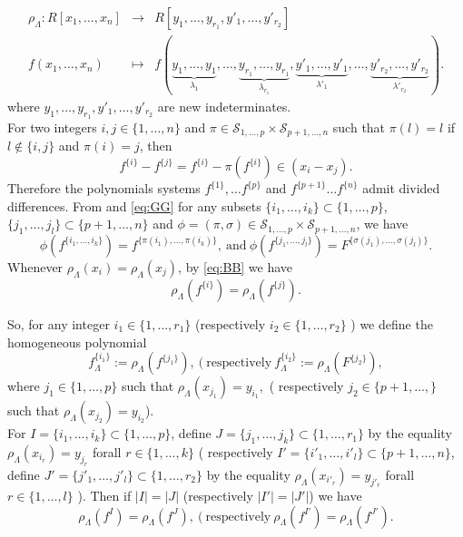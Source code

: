 \documentclass[12pt,a4paper,reqno]{amsart}
\theoremstyle{definition}
\theoremstyle{remark}
\numberwithin{equation}{section}
\begin{document}
\begin{eqnarray}\label{eq:rhol}
 \rho_{\Lambda} : R[x_{1},\ldots,x_{n}] & \rightarrow & R[y_{1},\ldots,y_{r_1},y'_{1},\ldots,y'_{r_2}] \\ \nonumber
 f(x_{1},\ldots,x_{n}) & \mapsto & f( \underbrace{y_{1},\ldots,y_{1}}_{\lambda_{1}} ,\ldots, \underbrace{y_{r_1},\ldots,y_{r_1}}_{\lambda_{r_1}}, \underbrace{y'_{1},\ldots,y'_{1}}_{\lambda'_{1}} ,\ldots, \underbrace{y'_{r_2},\ldots,y'_{r_2}}_{\lambda'_{r_2}}).
 \end{eqnarray} where $y_{1},\ldots,y_{r_1},y'_{1},\ldots,y'_{r_2}$ are new indeterminates.\\
For two integers ${i,j} \in \{ 1,\ldots,n \}$ and $\pi \in \mathcal{S}_{1,\ldots,p} \times \mathcal{S}_{p+1, \ldots,n}$ such that $\pi(l)=l$ if $l\notin \{i,j \}$ and $\pi(i)=j$, then 
\begin{equation} \label{eq:BB}
 f^{\{i\}} -f^{\{j\}} = f^{\{i\}}-\pi(f^{\{i\}}) \in (x_i-x_j).
 \end{equation}
Therefore the polynomials systems $f^{\{1\}}, \ldots f^{\{p\}}$ and  $f^{\{p+1\}} \ldots f^{\{n\}}$ admit divided differences. From \cite[Lemma 2.1]{BuKa16} and \eqref{eq:GG}
for any subsets $\{i_1, \ldots, i_k \} \subset \{1,\ldots,p\}$, $\{j_1, \ldots, j_l\} \subset \{p+1,\ldots,n \}$ and $\phi=(\pi, \sigma) \in  \mathcal{S}_{1,\ldots,p} \times \mathcal{S}_{p+1, \ldots,n}$, we have 
\begin{equation}
\phi (f^{\{i_1, \ldots, i_k \}})= f^{ \{ \pi(i_1), \ldots, \pi(i_k) \}},\  \mbox{and}\  \phi (f^{\{j_1, \ldots, j_l \}})= F^{ \{ \sigma (j_1), \ldots, \sigma(j_l) \}}.
\end{equation}
Whenever $\rho_{\Lambda} (x_i)=\rho_{\Lambda}(x_j)$, by \eqref{eq:BB} we have 
$$ \rho_{\Lambda} (f^{\{i\}})= \rho_{\Lambda}(f^{\{j\}}).$$ 

So, for any integer $ i_1 \in \{ 1, \ldots, r_1 \}$ (respectively $ i_2 \in \{ 1, \ldots, r_2 \}$ ) we define the homogeneous polynomial
$$ f_{\Lambda}^{\{i_1\}} := \rho_{\Lambda} (f^{\{j_1\}}),\  (\  \mbox{respectively}\  f_{\Lambda}^{\{i_2\}} := \rho_{\Lambda} (F^{\{j_2\}}),$$
where $ j_1 \in \{1,\ldots, p \}$ such that $ \rho_{\Lambda}(x_{j_1})=y_{i_1},$ ( respectively $ j_2 \in \{p+1,\ldots, \} $ such that $ \rho_{\Lambda}(x_{j_2})=y_{i_2}$).\\
For  $I = \{i_1, \ldots, i_k \} \subset  \{1,\ldots, p \}$, define  $J = \{ j_1, \ldots, j_k \} \subset  \{1,\ldots, r_1 \}$
by the equality $ \rho_{\Lambda} (x_{i_r})= y_{j_r}$ forall $r \in \{ 1, \ldots, k\}$ ( respectively  
 $I' = \{i'_1, \ldots, i'_l \} \subset  \{p+1,\ldots, n \}$, define  $J' = \{ j'_1, \ldots, j'_l \} \subset  \{1,\ldots, r_2 \}$
by the equality $ \rho_{\Lambda} (x_{i'_r})= y_{j'_r}$ forall $r \in \{ 1, \ldots, l\}$ ). Then if $|I|=|J|$ (respectively $|I'|=|J'|$) we have
$$ \rho_{\Lambda}(f^{I})= \rho_{\Lambda} (f^{J}),\ (\ \mbox{respectively}\   \rho_{\Lambda}(f^{I'})= \rho_{\Lambda} (f^{J'}).$$
\end{document}
